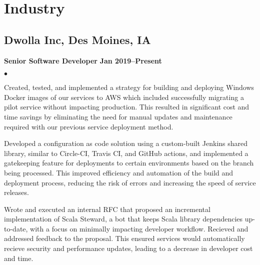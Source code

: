 \documentclass[10pt,letterpaper]{article}
\renewenvironment{itemize}{
  \begin{list}{}{
      \setlength{\leftmargin}{1.5em}
      \setlength{\itemsep}{0.25em}
      \setlength{\parskip}{0pt}
      \setlength{\parsep}{0.25em}
    }
  }{
  \end{list}
}
\newenvironment{bitemize}{
  \begin{list}{\(\bullet \)}{
      \setlength{\leftmargin}{1.5em}
      \setlength{\itemsep}{0.25em}
      \setlength{\parskip}{0pt}
      \setlength{\parsep}{0.25em}
    }
  }{
  \end{list}
}
\newcommand{\yearrange}[1]{\hfill \textbf{#1} \par}
\begin{document}
\section*{Industry}

\subsection*{Dwolla Inc, Des Moines, IA}

\begin{itemize}
  \item \textbf{Senior Software Developer} \yearrange{Jan 2019--Present}
        \begin{bitemize}
          \item Created, tested, and implemented a strategy for building and deploying
          Windows Docker images of our services to AWS which included successfully
          migrating a pilot service without impacting production. This resulted in
          significant cost and time savings by eliminating the need for manual
          updates and maintenance required with our previous service deployment
          method.
          \item Developed a configuration as code solution using a custom-built
          Jenkins shared library, similar to Circle-CI, Travis CI, and GitHub
          actions, and implemented a gatekeeping feature for deployments to certain
          environments based on the branch being processed. This improved efficiency
          and automation of the build and deployment process, reducing the risk of
          errors and increasing the speed of service releases.
          \item Wrote and executed an internal RFC that proposed an incremental
          implementation of Scala Steward, a bot that keeps Scala library
          dependencies up-to-date, with a focus on minimally impacting developer
          workflow. Recieved and addressed feedback to the proposal. This ensured
          services would automatically recieve security and performance updates,
          leading to a decrease in developer cost and time.
        \end{bitemize}
\end{itemize}
\end{document}
